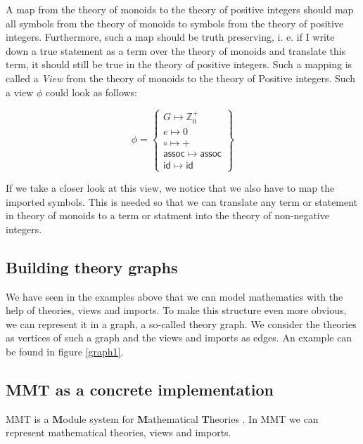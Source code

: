 \vspace{20px}

A map from the theory of monoids to the theory of positive integers should map all symbols from the theory of monoids to symbols from the theory of positive integers. Furthermore, such a map should be truth preserving, i. e. if I write down a true statement as a term over the theory of monoids and translate this term, it should still be true  in the theory of positive integers. Such a mapping is called a \textit{View} from the theory of monoids to the theory of Positive integers. Such a view $\phi$ could look as follows:

\[
  \phi=\left\{\begin{array}{l}
  G \mapsto \mathbb{Z}^{+}_{0}\\
  e \mapsto 0\\
  \circ \mapsto +\\
  \mathsf{assoc} \mapsto \mathsf{assoc}\\
  \mathsf{id} \mapsto \mathsf{id}
  \end{array}\right\}
\]

If we take a closer look at this view, we notice that we also have to map the imported symbols. This is needed so that we can translate any term or statement in theory of monoids to a term or statment into the theory of non-negative integers.

\subsection{Building theory graphs}

 We have seen in the examples above that we can model mathematics with the help of theories, views and imports. To make this structure even more obvious, we can represent it in a graph, a so-called theory graph. We consider the theories as vertices of such a graph and the views and imports as edges. An example can be found in figure \ref{graph1}.



\subsection{MMT as a concrete implementation}

MMT is a \textbf{M}odule system for \textbf{M}athematical \textbf{T}heories \cite{RabKoh:WSMSML13}. In MMT we can represent mathematical theories, views and imports. 
